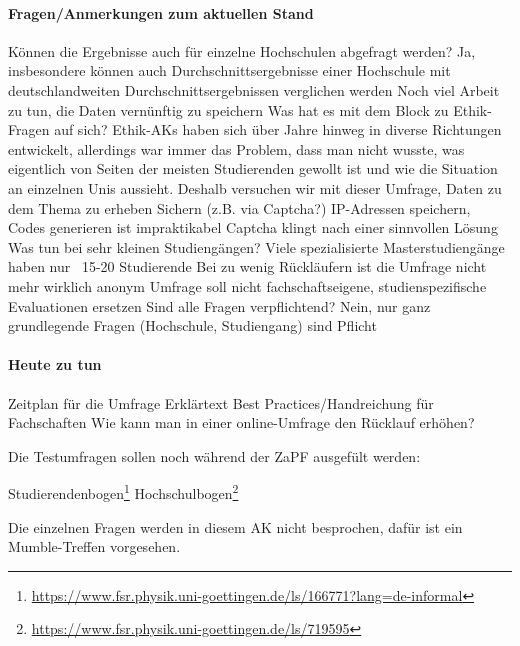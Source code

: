       \paragraph{Fragen/Anmerkungen zum aktuellen Stand}
        \begin{outline}
          \1 Können die Ergebnisse auch für einzelne Hochschulen abgefragt werden?
            \2 Ja, insbesondere können auch Durchschnittsergebnisse einer Hochschule mit deutschlandweiten Durchschnittsergebnissen verglichen werden
            \2 Noch viel Arbeit zu tun, die Daten vernünftig zu speichern
          \1 Was hat es mit dem Block zu Ethik-Fragen auf sich?
            \2 Ethik-AKs haben sich über Jahre hinweg in diverse Richtungen entwickelt, allerdings war immer das Problem, dass man nicht wusste, was eigentlich von Seiten der meisten Studierenden gewollt ist und wie die Situation an einzelnen Unis aussieht.
            \2 Deshalb versuchen wir mit dieser Umfrage, Daten zu dem Thema zu erheben
          \1 Sichern (z.B. via Captcha?)
            \2 IP-Adressen speichern, Codes generieren ist impraktikabel
            \2 Captcha klingt nach einer sinnvollen Lösung
          \1 Was tun bei sehr kleinen Studiengängen?
            \2 Viele spezialisierte Masterstudiengänge haben nur ~15-20 Studierende
            \2 Bei zu wenig Rückläufern ist die Umfrage nicht mehr wirklich anonym
            \2 Umfrage soll nicht fachschaftseigene, studienspezifische Evaluationen ersetzen
          \1 Sind alle Fragen verpflichtend?
            \2 Nein, nur ganz grundlegende Fragen (Hochschule, Studiengang) sind Pflicht
        \end{outline}

      \paragraph{Heute zu tun}
        \begin{outline}
          \1 Zeitplan für die Umfrage
          \1 Erklärtext
          \1 Best Practices/Handreichung für Fachschaften
            \2Wie kann man in einer online-Umfrage den Rücklauf erhöhen?
        \end{outline}

        Die Testumfragen sollen noch während der ZaPF ausgefült werden:
        \begin{outline}
          \1 Studierendenbogen\footnote{\url{https://www.fsr.physik.uni-goettingen.de/ls/166771?lang=de-informal}}
          \1 Hochschulbogen\footnote{\url{https://www.fsr.physik.uni-goettingen.de/ls/719595}}
        \end{outline}
        Die einzelnen Fragen werden in diesem AK nicht besprochen, dafür ist ein Mumble-Treffen vorgesehen.

